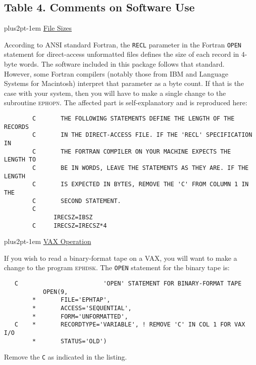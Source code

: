 \documentclass[twoside,11pt]{article}
\renewcommand{\_}{\texttt{\symbol{95}}}
\newcommand{\hdg}[1]{\vskip4pt plus2pt\leavevmode\kern-1em \underline{\large{#1}}\par}
\newcommand{\hdg}[1]{\subsection*{{#1}}}
\begin{document}
\begin{center}
\section*{Table 4. Comments on Software Use}
\end{center}

\hdg{File Sizes}

According to ANSI standard Fortran, the {\tt RECL} parameter in the
Fortran {\tt OPEN} statement for direct-access
unformatted files defines the size of each record in 4-byte words.
The software included in this package follows that standard.
However, some Fortran compilers (notably those from IBM
and Language Systems for Macintosh) interpret that parameter as a
byte count. If that is the case with your system, then you will have
to make a single change to the subroutine \textsc{ephopn}.
The affected part is self-explanatory and is reproduced here:
\begin{verbatim}
        C       THE FOLLOWING STATEMENTS DEFINE THE LENGTH OF THE RECORDS
        C       IN THE DIRECT-ACCESS FILE. IF THE 'RECL' SPECIFICATION IN
        C       THE FORTRAN COMPILER ON YOUR MACHINE EXPECTS THE LENGTH TO
        C       BE IN WORDS, LEAVE THE STATEMENTS AS THEY ARE. IF THE LENGTH
        C       IS EXPECTED IN BYTES, REMOVE THE 'C' FROM COLUMN 1 IN THE
        C       SECOND STATEMENT.
        C
              IRECSZ=IBSZ
        C     IRECSZ=IRECSZ*4
\end{verbatim}

\hdg{VAX Operation}

If you wish to read a binary-format tape on a VAX, you will want to
make a change to the program \textsc{ephdsk}. The {\tt OPEN} statement
for the binary tape is:
\begin{verbatim}
   C                        'OPEN' STATEMENT FOR BINARY-FORMAT TAPE
           OPEN(9,
        *       FILE='EPHTAP',
        *       ACCESS='SEQUENTIAL',
        *       FORM='UNFORMATTED',
   C    *       RECORDTYPE='VARIABLE', ! REMOVE 'C' IN COL 1 FOR VAX I/O
        *       STATUS='OLD')
\end{verbatim}
Remove the {\tt C} as indicated in the listing.
 
\end{document}
